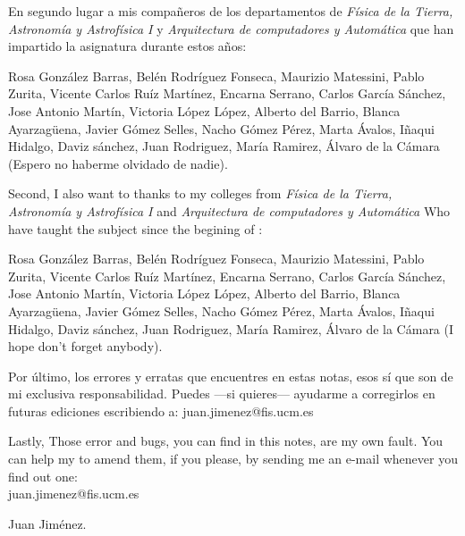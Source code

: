 \begin{paracol}{2}
\switchcolumn
En segundo lugar a mis compañeros de los departamentos de  \emph{Física de la Tierra, Astronomía y Astrofísica I} y  \emph{Arquitectura de computadores y Automática} que han impartido la asignatura durante estos años: 

Rosa González Barras, Belén Rodríguez Fonseca, Maurizio Matessini, Pablo Zurita, Vicente Carlos Ruíz Martínez, Encarna Serrano, Carlos García Sánchez, Jose Antonio Martín, Victoria López López,  Alberto del Barrio, Blanca Ayarzagüena, Javier Gómez Selles, Nacho Gómez Pérez, Marta Ávalos, Iñaqui Hidalgo, Daviz sánchez,  Juan Rodriguez, María Ramirez, Álvaro de la Cámara (Espero no haberme olvidado de nadie).

\switchcolumn
Second, I also want to thanks to my colleges from \emph{Física de la Tierra, Astronomía y Astrofísica I} and  \emph{Arquitectura de computadores y Automática} Who have taught the subject since the begining of : 

Rosa González Barras, Belén Rodríguez Fonseca, Maurizio Matessini, Pablo Zurita, Vicente Carlos Ruíz Martínez, Encarna Serrano, Carlos García Sánchez, Jose Antonio Martín, Victoria López López,  Alberto del Barrio, Blanca Ayarzagüena, Javier Gómez Selles, Nacho Gómez Pérez, Marta Ávalos, Iñaqui Hidalgo, Daviz sánchez,  Juan Rodriguez, María Ramirez, Álvaro de la Cámara (I hope don't forget anybody).

\switchcolumn
Por último, los errores y erratas que encuentres en estas notas, esos sí que son de mi exclusiva responsabilidad.  Puedes ---si quieres--- ayudarme a corregirlos en futuras ediciones escribiendo a: juan.jimenez@fis.ucm.es 

\switchcolumn
Lastly, Those error and bugs, you can find in this notes, are my own fault. You can help my to amend them, if you please, by sending me an e-mail whenever you find out one:\\ juan.jimenez@fis.ucm.es 
\end{paracol}

\begin{flushright}
Juan Jiménez.
\end{flushright}

